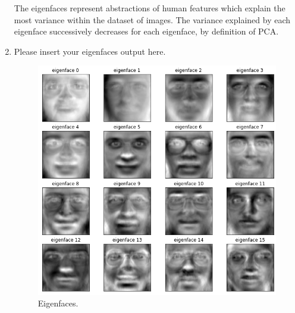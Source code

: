 \begin{enumerate}
    The eigenfaces represent abstractions of human features which explain the most variance within the dataset of images. The variance explained by each eigenface successively decreases for each eigenface, by definition of PCA.
    \item Please insert your eigenfaces output here.
\begin{figure}[H]
\centering
\includegraphics[width=.6\textwidth]{templates/eigenfaces}
\caption{Eigenfaces.}
\label{fig:my_label}
\end{figure}
\end{enumerate}
